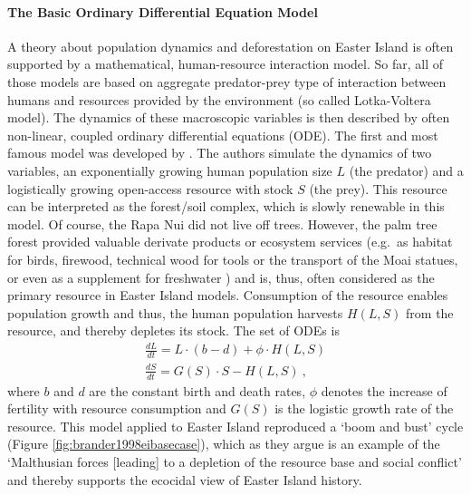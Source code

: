 \paragraph{The Basic Ordinary Differential Equation Model}
A theory about population dynamics and deforestation on Easter Island is often supported by a mathematical, human-resource interaction model.
So far, all of those models are based on aggregate predator-prey type of interaction between humans and resources provided by the environment (so called Lotka-Voltera model).
The dynamics of these macroscopic variables is then described by often non-linear, coupled ordinary differential equations (ODE).
The first and most famous model was developed by \citet{Brander1998}. 
The authors simulate the dynamics of two variables, an exponentially growing human population size $L$ (the predator) and a logistically growing open-access resource with stock $S$ (the prey).
This resource can be interpreted as the forest/soil complex, which is slowly renewable in this model. 
Of course, the Rapa Nui did not live off trees.
However, the palm tree forest provided valuable derivate products or ecosystem services (e.g.\ as habitat for birds, firewood, technical wood for tools or the transport of the Moai statues, or even as a supplement for freshwater \citep{Bahn2017}) and is, thus, often considered as the primary resource in Easter Island models.
Consumption of the resource enables population growth and thus, the human population harvests $H(L,S)$ from the resource, and thereby depletes its stock.
The set of ODEs is
\begin{eqnarray}\label{eq:Brander}
\frac{dL}{dt} = L \cdot (b-d) + \phi \cdot H(L,S) \\
\frac{dS}{dt} = G(S)\cdot S - H(L,S) \ ,
\end{eqnarray}
where $b$ and $d$ are the constant birth and death rates, $\phi$ denotes the increase of fertility with resource consumption and $G(S)$ is the logistic growth rate of the resource.
This model applied to Easter Island reproduced a `boom and bust' cycle (Figure \ref{fig:brander1998eibasecase}), which as they argue is an example of the `Malthusian forces [leading] to a depletion of the resource base and social conflict' and thereby supports the ecocidal view of Easter Island history.
